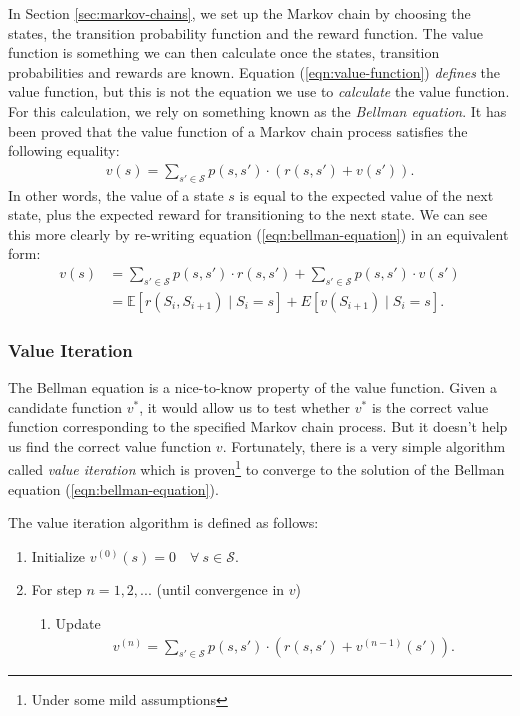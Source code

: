 \documentclass{article}
\begin{document}
      In Section \ref{sec:markov-chains}, we set up the Markov chain by choosing the states, the transition probability function and the reward function. The value function is something we can then calculate once the states, transition probabilities and rewards are known. Equation (\ref{eqn:value-function}) {\it defines} the value function, but this is not the equation we use to {\it calculate} the value function. For this calculation, we rely on something known as the {\it Bellman equation}. It has been proved that the value function of a Markov chain process satisfies the following equality:
      \begin{align}
        \label{eqn:bellman-equation}
        v(s) = \sum_{s' \in \mathcal S} p(s, s') \cdot (r(s, s') + v(s')).
      \end{align}
      In other words, the value of a state $s$ is equal to the expected value of the next state, plus the expected reward for transitioning to the next state. We can see this more clearly by re-writing equation (\ref{eqn:bellman-equation}) in an equivalent form:
      \begin{align*}
        v(s) &= \sum_{s' \in \mathcal S} p(s, s') \cdot r(s, s') + \sum_{s' \in \mathcal S} p(s, s') \cdot v(s')\\
        &= \mathbb E[r(S_i, S_{i+1}) \mid S_i = s] + E[v(S_{i+1}) \mid S_i = s].
      \end{align*}

    \subsubsection{\sc Value Iteration}

      The Bellman equation is a nice-to-know property of the value function. Given a candidate function $v^*$, it would allow us to test whether $v^*$ is the correct value function corresponding to the specified Markov chain process. But it doesn't help us find the correct value function $v$. Fortunately, there is a very simple algorithm called {\it value iteration} which is proven\footnote{Under some mild assumptions} to converge to the solution of the Bellman equation (\ref{eqn:bellman-equation}).

      The value iteration algorithm is defined as follows:
      \begin{enumerate}
        \item Initialize $v^{(0)}(s) = 0 \quad \forall~s\in\mathcal S$.
        \item For step $n = 1, 2, ...$ (until convergence in $v$)
        \begin{enumerate}
          \item Update
            \begin{align*}
              v^{(n)} = \sum_{s' \in \mathcal S} p(s, s') \cdot (r(s, s') + v^{(n-1)}(s')).
            \end{align*}
        \end{enumerate}
      \end{enumerate}
\end{document}
